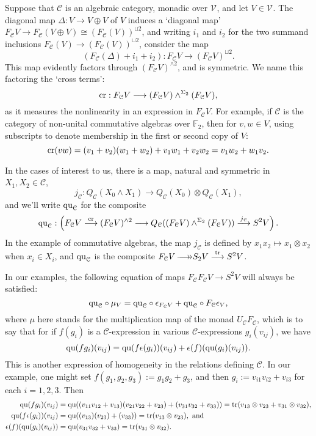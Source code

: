 \documentclass[11pt]{amsart}
\theoremstyle{plain}
\theoremstyle{definition}
\DeclareMathOperator{\trace}{tr}
\renewcommand{\to}{\longrightarrow}
\newcommand{\calC}{\mathcal{C}}
\newcommand{\calV}{\mathcal{V}}
\theoremstyle{plain}
\newcommand{\vect}[2]{\calV^{#1}_{#2}}
\newcommand{\quadratic}{\textup{qu}}
\newcommand{\crossterms}{\textup{cr}}
\newcommand{\epi}{{\,\makebox[0cm][l]{\ensuremath\to}\to}}
\newcommand{\F}{\mathbb{F}}
\begin{document}
\begin{Conventions and notation}
Suppose that $\calC$ is an algebraic category, monadic over $\vect{}{}$, and let $V\in\vect{}{}$. The diagonal map $\Delta:V\to V\oplus V$ of $V$ induces a `diagonal map' $F_\calC V\to F_\calC (V\oplus V)\cong (F_\calC (V))^{\sqcup 2}$, and writing $i_1$ and $i_2$ for the two summand inclusions $F_\calC (V)\to (F_\calC (V))^{\sqcup 2}$, consider the map
\[(F_\calC(\Delta)+i_1+i_2):F_\calC V\to (F_\calC V)^{\sqcup2}.\]
This map evidently factors through $(F_\calC V)^{\wedge 2}$, and is symmetric. We name this factoring the `cross terms':
\[\crossterms:F_\calC V\to (F_\calC V)\wedge^{\Sigma_2} (F_\calC V),\]
as it measures the nonlinearity in an expression in $F_\calC V$. For example, if $\calC$ is the category of non-unital commutative algebras over $\F_2$, then for $v,w\in V$, using subscripts to denote membership in the first or second copy of $V$:
\[\crossterms(vw)=(v_1+v_2)(w_1+w_2)+v_1w_1+v_2w_2=v_1w_2+w_1v_2.\]

In the cases of interest to us, there is a map, natural and symmetric in $X_1,X_2\in\calC$,
\[j_\calC:Q_\calC(X_0\wedge X_1)\to Q_\calC(X_0)\otimes Q_\calC(X_1),\]
and we'll write $\quadratic_\calC$ for the composite
\[\quadratic_\calC:\left(F_\calC V\overset{\crossterms}{\to}(F_\calC V)^{\wedge 2}\to Q_\calC((F_\calC V)\wedge^{\Sigma_2} (F_\calC V))\overset{j_\calC}{\to}S^2V\right).\]
In the example of commutative algebras, the map $j_\calC$ is defined by $x_1x_2\mapsto x_1\otimes x_2$ when $x_i\in X_i$, and $\quadratic_\calC$ is the composite $F_\calC V\epi S_2V\overset{\trace}{\to}S^2V$.

In our examples, the following equation of maps $F_\calC F_\calC V\to S^2 V$ will always be satisfied:
\[\quadratic_\calC\circ\mu_V=\quadratic_\calC\circ \epsilon_{F_\calC V} +\quadratic_\calC\circ {F_\calC \epsilon_V},\]
where $\mu$ here stands for the multiplication map of the monad $U_\calC F_\calC $, which is to say that for if  $f(g_i)$ is a $\calC$-expression in various $\calC$-expressions $g_i(v_{ij})$, we have 
\[\quadratic(fg_i)(v_{ij})=\quadratic(f\epsilon(g_i))(v_{ij})+\epsilon(f)(\quadratic(g_i)(v_{ij})).\]
This is another expression of homogeneity in the relations defining $\calC$. In our example, one might set $f(g_1,g_2,g_3):=g_1g_2+g_3$, and then $g_i:=v_{i1}v_{i2}+v_{i3}$ for each $i=1,2,3$. Then
{\small
\begin{alignat*}{2}
\quadratic(fg_i)(v_{ij})&=\quadratic((v_{11}v_{12}+v_{13})(v_{21}v_{22}+v_{23})+(v_{31}v_{32}+v_{33}))=\trace(v_{13}\otimes v_{23}+v_{31}\otimes v_{32}),\\
\quadratic(f\epsilon(g_i))(v_{ij})&=\quadratic((v_{13})(v_{23})+(v_{33}))=\trace(v_{13}\otimes v_{23}),\textup{ and}\\
\epsilon(f)(\quadratic(g_i)(v_{ij}))&=\quadratic(v_{31}v_{32}+v_{33})=\trace(v_{31}\otimes v_{32}).
\end{alignat*}
}



\end{Conventions and notation}
\end{document}
